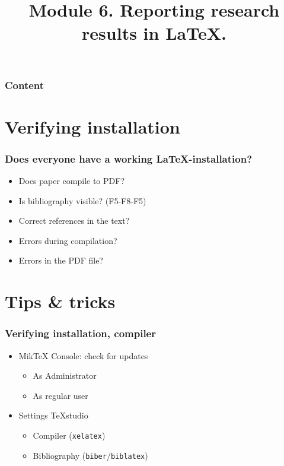 \documentclass[aspectratio=169]{beamer}
\title{Module 6. Reporting research results in \LaTeX{}.}
\subtitle{\coursename}
\author{\lecturers}   %
\date{\academicyear}
\begin{document}
\begin{frame}
  \maketitle
\end{frame}

\begin{frame}
  \frametitle{Content}

  \tableofcontents
\end{frame}

\section{Verifying installation}

\begin{frame}
  \frametitle{Does everyone have a working {\LaTeX}-installation?}

  \begin{itemize}
   \item Does paper compile to PDF?
   \item Is bibliography visible? (F5-F8-F5)
   \item Correct references in the text?
   \item Errors during compilation?
   \item Errors in the PDF file?
  \end{itemize}

\end{frame}

\section{Tips \& tricks}


\begin{frame}
  \frametitle{Verifying installation, compiler}

  \begin{itemize}
    \item Mik{\TeX} Console: check for updates
          \begin{itemize}
            \item As Administrator
            \item As regular user
          \end{itemize}
    \item Settings TeXstudio
          \begin{itemize}
            \item Compiler (\texttt{xelatex})
            \item Bibliography (\texttt{biber}/\texttt{biblatex})
          \end{itemize}
  \end{itemize}

\end{frame}
\end{document}
